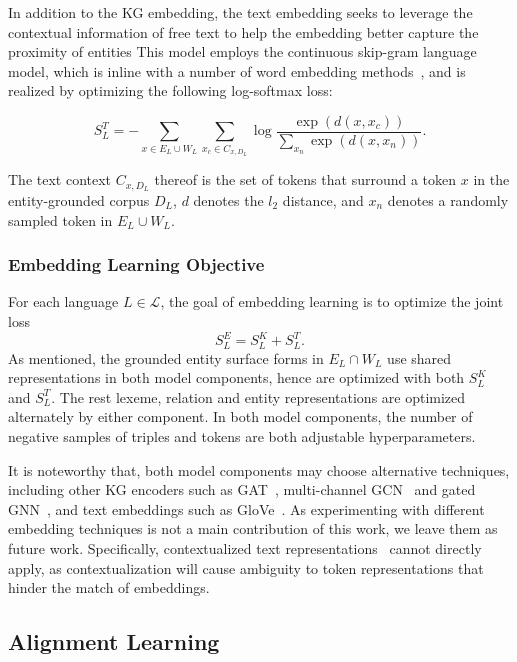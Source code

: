 \documentclass[11pt,a4paper]{article}
\def\lang{\mathcal{L}}
\begin{document}
In addition to the KG embedding,
the text embedding seeks to leverage the contextual information of free text to help the embedding better capture the proximity of entities
This model employs the continuous skip-gram language model, which is inline with a number of word embedding methods~\cite{mikolov2013efficient,bojanowski2017enriching,conneau2018word}, and is realized by optimizing the following log-softmax loss:

\begin{equation*}
S^T_L=-\sum_{x\in E_L\cup W_L} \sum_{x_c\in C_{x,D_L}}\log\frac{\exp \left ( d(x, {x}_c) \right )}{\sum_{x_n}\exp \left ( d(x, {x}_n) \right )}.
\end{equation*}

\noindent
The text context $C_{x,D_L}$ thereof is the set of tokens that surround a token $x$ in the entity-grounded corpus $D_L$, $d$ denotes the $l_2$ distance, and $x_n$ denotes a randomly sampled token in $E_L\cup W_L$.

\subsubsection{Embedding Learning Objective}

For each language $L\in \lang$, the goal of embedding learning is to optimize the joint loss 
$$S^E_L=S^K_L+S^T_L.$$
As mentioned, the grounded entity surface forms in $E_L\cap W_L$ use shared representations in both model components, hence are optimized with both $S^K_L$ and $S^T_L$.
The rest lexeme, relation and entity representations are optimized alternately by either component.
In both model components, the number of negative samples of triples and tokens are both adjustable hyperparameters.

It is noteworthy that, both model components may choose alternative techniques, including other KG encoders such as GAT~\cite{velivckovic2018gat}, multi-channel GCN~\cite{cao2019multi} and gated GNN~\cite{sun2020alinet}, and text embeddings such as GloVe~\cite{pennington2014glove}.
As experimenting with different embedding techniques is not a main contribution of this work, we leave them as future work.
Specifically, contextualized text representations~\cite{peters2018deep,devlin2019bert} cannot directly apply, as contextualization will cause ambiguity to token representations that hinder the match of embeddings.

\subsection{Alignment Learning}
\end{document}
